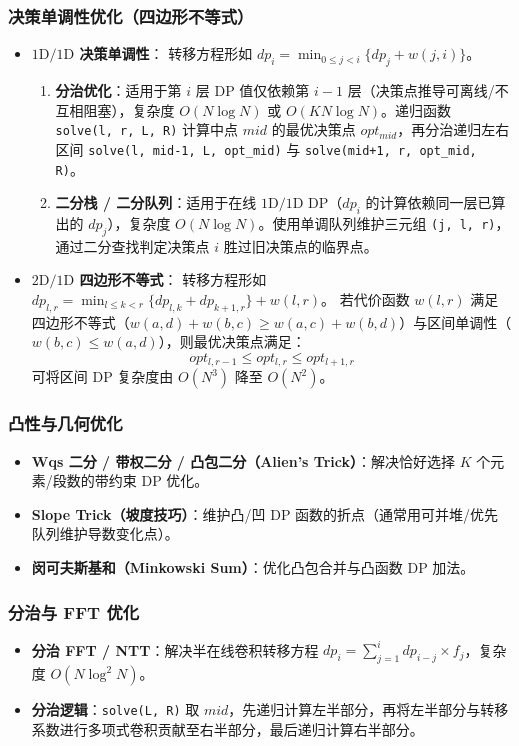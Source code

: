 \subsubsection{决策单调性优化（四边形不等式）}
\begin{itemize}
    \item \textbf{$1\mathrm{D}/1\mathrm{D}$ 决策单调性}：
    转移方程形如 $dp_i = \min_{0 \le j < i} \{ dp_j + w(j, i) \}$。
    \begin{enumerate}
        \item \textbf{分治优化}：适用于第 $i$ 层 DP 值仅依赖第 $i-1$ 层（决策点推导可离线/不互相阻塞），复杂度 $O(N \log N)$ 或 $O(K N \log N)$。递归函数 \texttt{solve(l, r, L, R)} 计算中点 $mid$ 的最优决策点 $opt_{mid}$，再分治递归左右区间 \texttt{solve(l, mid-1, L, opt\_mid)} 与 \texttt{solve(mid+1, r, opt\_mid, R)}。
        \item \textbf{二分栈 / 二分队列}：适用于在线 $1\mathrm{D}/1\mathrm{D}$ DP（$dp_i$ 的计算依赖同一层已算出的 $dp_j$），复杂度 $O(N \log N)$。使用单调队列维护三元组 \texttt{(j, l, r)}，通过二分查找判定决策点 $i$ 胜过旧决策点的临界点。
    \end{enumerate}

    \item \textbf{$2\mathrm{D}/1\mathrm{D}$ 四边形不等式}：
    转移方程形如 $dp_{l, r} = \min_{l \le k < r} \{ dp_{l, k} + dp_{k+1, r} \} + w(l, r)$。
    若代价函数 $w(l, r)$ 满足四边形不等式（$w(a, d) + w(b, c) \ge w(a, c) + w(b, d)$）与区间单调性（$w(b, c) \le w(a, d)$），则最优决策点满足：
    \[ opt_{l, r-1} \le opt_{l, r} \le opt_{l+1, r} \]
    可将区间 DP 复杂度由 $O(N^3)$ 降至 $O(N^2)$。
\end{itemize}

\subsubsection{凸性与几何优化}
\begin{itemize}
    \item \textbf{Wqs 二分 / 带权二分 / 凸包二分（Alien's Trick）}：解决恰好选择 $K$ 个元素/段数的带约束 DP 优化。
    \item \textbf{Slope Trick（坡度技巧）}：维护凸/凹 DP 函数的折点（通常用可并堆/优先队列维护导数变化点）。
    \item \textbf{闵可夫斯基和（Minkowski Sum）}：优化凸包合并与凸函数 DP 加法。
\end{itemize}

\subsubsection{分治与 FFT 优化}
\begin{itemize}
    \item \textbf{分治 FFT / NTT}：解决半在线卷积转移方程 $dp_i = \sum_{j=1}^{i} dp_{i-j} \times f_j$，复杂度 $O(N \log^2 N)$。
    \item \textbf{分治逻辑}：\texttt{solve(L, R)} 取 $mid$，先递归计算左半部分，再将左半部分与转移系数进行多项式卷积贡献至右半部分，最后递归计算右半部分。
\end{itemize}


